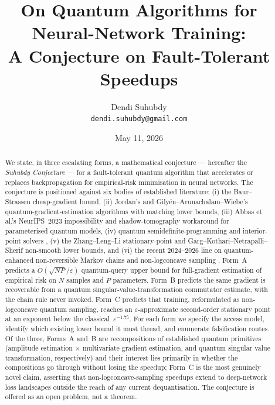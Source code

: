 \documentclass[11pt,a4paper]{article}
\title{\textbf{On Quantum Algorithms for Neural-Network Training:\\
A Conjecture on Fault-Tolerant Speedups}}
\author{Dendi Suhubdy\\\small\texttt{dendi.suhubdy@gmail.com}}
\date{May 11, 2026}
\theoremstyle{definition}
\newcommand{\Otil}{\widetilde{O}}
\newcommand{\veps}{\varepsilon}
\begin{document}
\maketitle

\begin{abstract}
We state, in three escalating forms, a mathematical conjecture --- hereafter the \emph{Suhubdy Conjecture} --- for a fault-tolerant quantum algorithm that accelerates or replaces backpropagation for empirical-risk minimisation in neural networks. The conjecture is positioned against six bodies of established literature: (i) the Baur--Strassen \cite{BaurStrassen1983} cheap-gradient bound, (ii) Jordan's \cite{Jordan2005} and Gily\'{e}n--Arunachalam--Wiebe's \cite{GAW2019} quantum-gradient-estimation algorithms with matching lower bounds, (iii) Abbas et al.'s \cite{AbbasEtAl2023} NeurIPS~2023 impossibility and shadow-tomography workaround for parameterised quantum models, (iv) quantum semidefinite-programming and interior-point solvers \cite{BrandaoSvore2017,vAGGdW2020,KerenidisPrakash2020,Augustino2023}, (v) the Zhang--Leng--Li \cite{ZhangLengLi2023} stationary-point and Garg--Kothari--Netrapalli--Sherif \cite{GKNS2021} non-smooth lower bounds, and (vi) the recent 2024--2026 line on quantum-enhanced non-reversible Markov chains and non-logconcave sampling \cite{QuantumNonLogconcave2025,QuantumMCMCOpt2025}. Form~A predicts a $\Otil(\sqrt{NP}/\veps)$ quantum-query upper bound for full-gradient estimation of empirical risk on $N$ samples and $P$ parameters. Form~B predicts the same gradient is recoverable from a quantum singular-value-transformation commutator estimate, with the chain rule never invoked. Form~C predicts that training, reformulated as non-logconcave quantum sampling, reaches an $\veps$-approximate second-order stationary point at an exponent below the classical~$\veps^{-1.75}$. For each form we specify the access model, identify which existing lower bound it must thread, and enumerate falsification routes. Of the three, Forms~A and~B are recompositions of established quantum primitives (amplitude estimation $\times$ multivariate gradient estimation, and quantum singular value transformation, respectively) and their interest lies primarily in whether the compositions go through without losing the speedup; Form~C is the most genuinely novel claim, asserting that non-logconcave-sampling speedups extend to deep-network loss landscapes outside the reach of any current dequantisation. The conjecture is offered as an open problem, not a theorem.
\end{abstract}
\end{document}
